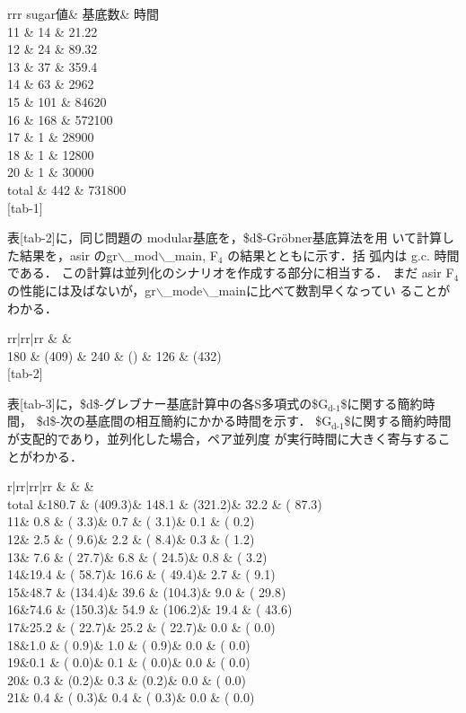\documentclass[a4j]{jarticle}
\begin{document}
{rrr sugar値\& 基底数\& 時間\\
11 \& 14 \& 21.22\\
12 \& 24 \& 89.32\\
13 \& 37 \& 359.4\\
14 \& 63 \& 2962\\
15 \& 101 \& 84620\\
16 \& 168 \& 572100\\
17 \& 1 \& 28900\\
18 \& 1 \& 12800\\
20 \& 1 \& 30000\\
total \& 442 \& 731800\\

[tab-1]

表[tab-2]に，同じ問題の modular基底を，\$d\$-Gröbner基底算法を用
いて計算した結果を，asir のgr$\backslash$\_mod$\backslash$\_main, F\(_4\) の結果とともに示す．括
弧内は g.c. 時間である．
この計算は並列化のシナリオを作成する部分に相当する． まだ asir F\(_4\)
の性能には及ばないが，gr$\backslash$\_mode$\backslash$\_mainに比べて数割早くなってい
ることがわかる．

rr|rr|rr \& \&\\
180 \& (409) \& 240 \& () \& 126 \& (432)\\

[tab-2]

表[tab-3]に，\$d\$-グレブナー基底計算中の各S多項式の\$G\(_{\text{d-1}}\)\$に関する簡約時間，
\$d\$-次の基底間の相互簡約にかかる時間を示す．
\$G\(_{\text{d-1}}\)\$に関する簡約時間が支配的であり，並列化した場合，ペア並列度
が実行時間に大きく寄与することがわかる．

r|rr|rr|rr \& \& \&\\
total \&180.7 \& (409.3)\& 148.1 \& (321.2)\& 32.2 \& ( 87.3)\\
11\& 0.8 \& ( 3.3)\& 0.7 \& ( 3.1)\& 0.1 \& ( 0.2)\\
12\& 2.5 \& ( 9.6)\& 2.2 \& ( 8.4)\& 0.3 \& ( 1.2)\\
13\& 7.6 \& ( 27.7)\& 6.8 \& ( 24.5)\& 0.8 \& ( 3.2)\\
14\&19.4 \& ( 58.7)\& 16.6 \& ( 49.4)\& 2.7 \& ( 9.1)\\
15\&48.7 \& (134.4)\& 39.6 \& (104.3)\& 9.0 \& ( 29.8)\\
16\&74.6 \& (150.3)\& 54.9 \& (106.2)\& 19.4 \& ( 43.6)\\
17\&25.2 \& ( 22.7)\& 25.2 \& ( 22.7)\& 0.0 \& ( 0.0)\\
18\&1.0 \& ( 0.9)\& 1.0 \& ( 0.9)\& 0.0 \& ( 0.0)\\
19\&0.1 \& ( 0.0)\& 0.1 \& ( 0.0)\& 0.0 \& ( 0.0)\\
20\& 0.3 \& (0.2)\& 0.3 \& (0.2)\& 0.0 \& ( 0.0)\\
21\& 0.4 \& ( 0.3)\& 0.4 \& ( 0.3)\& 0.0 \& ( 0.0)\\

}
\end{document}
